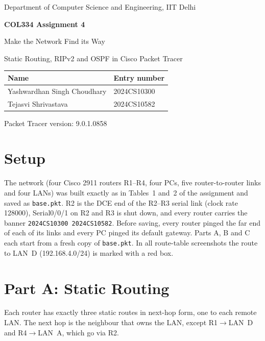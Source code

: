 \documentclass[11pt,a4paper]{article}
\newcommand{\cmd}[1]{\texttt{#1}}
\begin{document}
\begin{titlepage}
\centering
\vspace*{3cm}
{\large Department of Computer Science and Engineering, IIT Delhi\par}
\vspace{1cm}
{\Large\bfseries COL334 Assignment 4\par}
\vspace{0.4cm}
{\LARGE Make the Network Find its Way\par}
\vspace{0.4cm}
{\large Static Routing, RIPv2 and OSPF in Cisco Packet Tracer\par}
\vspace{2cm}
\begin{tabular}{ll}
\toprule
\textbf{Name} & \textbf{Entry number} \\
\midrule
Yashwardhan Singh Choudhary & 2024CS10300 \\
Tejasvi Shrivastava & 2024CS10582 \\
\bottomrule
\end{tabular}
\vfill
Packet Tracer version: 9.0.1.0858
\end{titlepage}

\section*{Setup}

The network (four Cisco 2911 routers R1--R4, four PCs, five router-to-router links and four
LANs) was built exactly as in Tables~1 and~2 of the assignment and saved as
\cmd{base.pkt}. R2 is the DCE end of the R2--R3 serial link (clock rate 128000),
Serial0/0/1 on R2 and R3 is shut down, and every router carries the banner
\cmd{2024CS10300 2024CS10582}. Before saving, every router pinged the far end of each of
its links and every PC pinged its default gateway. Parts A, B and C each start from a fresh
copy of \cmd{base.pkt}. In all route-table screenshots the route to LAN~D
(192.168.4.0/24) is marked with a red box.

\section{Part A: Static Routing}

Each router has exactly three static routes in next-hop form, one to each remote LAN. The
next hop is the neighbour that owns the LAN, except R1$\to$LAN~D and R4$\to$LAN~A, which go
via R2.
\end{document}
